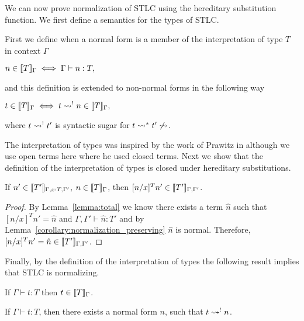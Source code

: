 We can now prove normalization of STLC using the hereditary substitution
function.  We first define a semantics for the types of STLC.
\begin{definition}
  \label{def:interpretation_of_types_stlc}
  First we define when a normal form is a member of the interpretation of type $T$ in context $\Gamma$
  \begin{center}
    \begin{math}
    n \in [\negthinspace[T]\negthinspace]_\Gamma \iff \Gamma \vdash n:T,
  \end{math}
  \end{center}
  and this definition is extended to non-normal forms in the following way
  \begin{center}
    \begin{math}
    t \in [\negthinspace[T]\negthinspace]_\Gamma \iff t \rightsquigarrow^{!} n \in [\negthinspace[T]\negthinspace]_\Gamma,
  \end{math}
  \end{center}
  where $t \rightsquigarrow^{!} t'$ is syntactic sugar for $t \rightsquigarrow^* t' \not \rightsquigarrow$.
\end{definition}
\noindent 
The interpretation of types was inspired by the work of Prawitz in
\cite{Prawitz:2005} although we use open terms here where he used
closed terms.  Next we show that the definition of the interpretation
of types is closed under hereditary substitutions.
\begin{lemma}
  If $n' \in [\negthinspace[T']\negthinspace]_{\Gamma,x:T,\Gamma'}$, $n \in [\negthinspace[T]\negthinspace]_\Gamma$, then 
  $[n/x]^T n' \in [\negthinspace[T']\negthinspace]_{\Gamma,\Gamma'}$.
  
  \label{lemma:interpretation_of_types_closed_substitution_stlc}
\end{lemma}
\begin{proof}
  By Lemma~\ref{lemma:total} we know there exists a term $\hat{n}$ 
  such that $[n/x]^T n' = \hat{n}$ and $\Gamma,\Gamma' \vdash \hat{n}:T'$ and by 
  Lemma~\ref{corollary:normalization_preserving} $\hat{n}$ is normal.  Therefore,
  $[n/x]^T n' = \hat{n} \in [\negthinspace[T']\negthinspace]_{\Gamma,\Gamma'}$.
\end{proof}
\noindent
Finally, by the definition of the interpretation of types the
following result implies that STLC is normalizing.
\begin{thm}
  If $\Gamma \vdash t:T$ then $t \in [\negthinspace[T]\negthinspace]_\Gamma$.
  \label{thm:soundness_stlc}
\end{thm}

\begin{corollary}
  If $\Gamma \vdash t:T$, then there exists a normal form $n$, such
  that $t \rightsquigarrow^{!} n$.
\end{corollary}

